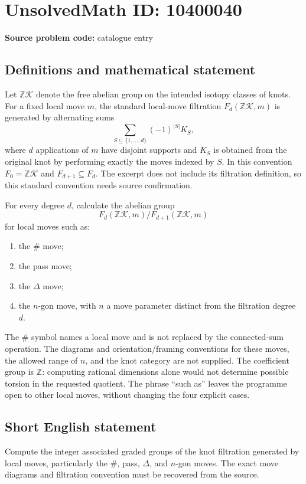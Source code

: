 \documentclass[11pt]{article}
\newcommand{\Z}{\mathbb{Z}}
\begin{document}
\section*{UnsolvedMath ID: 10400040}
\textbf{Source problem code:} catalogue entry
\subsection{Definitions and mathematical statement}
Let \(\Z\mathcal K\) denote the free abelian group on the intended isotopy classes of knots. For a fixed local move \(m\), the standard local-move filtration \(F_d(\Z\mathcal K,m)\) is generated by alternating sums
\[
 \sum_{S\subseteq\{1,\ldots,d\}}(-1)^{|S|}K_S,
\]
where \(d\) applications of \(m\) have disjoint supports and \(K_S\) is obtained from the original knot by performing exactly the moves indexed by \(S\). In this convention \(F_0=\Z\mathcal K\) and \(F_{d+1}\subseteq F_d\). The excerpt does not include its filtration definition, so this standard convention needs source confirmation.

For every degree \(d\), calculate the abelian group
\[
 F_d(\Z\mathcal K,m)/F_{d+1}(\Z\mathcal K,m)
\]
for local moves such as:
\begin{enumerate}
\item the \(\#\) move;
\item the pass move;
\item the \(\Delta\) move;
\item the \(n\)-gon move, with \(n\) a move parameter distinct from the filtration degree \(d\).
\end{enumerate}
The \(\#\) symbol names a local move and is not replaced by the connected-sum operation. The diagrams and orientation/framing conventions for these moves, the allowed range of \(n\), and the knot category are not supplied. The coefficient group is \(\Z\): computing rational dimensions alone would not determine possible torsion in the requested quotient. The phrase ``such as'' leaves the programme open to other local moves, without changing the four explicit cases.
\subsection{Short English statement}
Compute the integer associated graded groups of the knot filtration generated by local moves, particularly the \(\#\), pass, \(\Delta\), and \(n\)-gon moves. The exact move diagrams and filtration convention must be recovered from the source.
\end{document}
